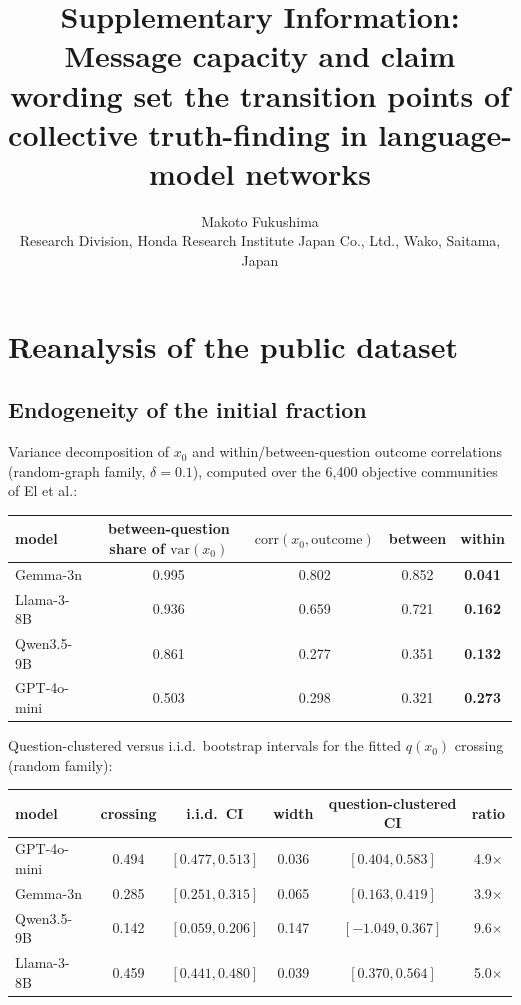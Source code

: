 \documentclass[11pt]{article}
\title{Supplementary Information:\\Message capacity and claim wording set the transition points of collective truth-finding in language-model networks}
\author{Makoto Fukushima\\[3pt]
{\normalsize Research Division, Honda Research Institute Japan Co., Ltd.,
Wako, Saitama, Japan}}
\date{}
\begin{document}
\maketitle
\tableofcontents

\section{Reanalysis of the public dataset}

\subsection{Endogeneity of the initial fraction}

Variance decomposition of $x_0$ and within/between-question outcome
correlations (random-graph family, $\delta = 0.1$), computed over the 6{,}400
objective communities of El et al.:

\begin{center}
\begin{tabular}{lcccc}
\toprule
model & between-question share of $\mathrm{var}(x_0)$ &
$\mathrm{corr}(x_0,\text{outcome})$ & between & \textbf{within} \\
\midrule
Gemma-3n     & 0.995 & 0.802 & 0.852 & \textbf{0.041} \\
Llama-3-8B   & 0.936 & 0.659 & 0.721 & \textbf{0.162} \\
Qwen3.5-9B   & 0.861 & 0.277 & 0.351 & \textbf{0.132} \\
GPT-4o-mini  & 0.503 & 0.298 & 0.321 & \textbf{0.273} \\
\bottomrule
\end{tabular}
\end{center}

Question-clustered versus i.i.d.\ bootstrap intervals for the fitted
$q(x_0)$ crossing (random family):

\begin{center}
\begin{tabular}{lccccc}
\toprule
model & crossing & i.i.d.\ CI & width & question-clustered CI & ratio \\
\midrule
GPT-4o-mini & 0.494 & $[0.477, 0.513]$ & 0.036 & $[0.404, 0.583]$ & 4.9$\times$ \\
Gemma-3n    & 0.285 & $[0.251, 0.315]$ & 0.065 & $[0.163, 0.419]$ & 3.9$\times$ \\
Qwen3.5-9B  & 0.142 & $[0.059, 0.206]$ & 0.147 & $[-1.049, 0.367]$ & 9.6$\times$ \\
Llama-3-8B  & 0.459 & $[0.441, 0.480]$ & 0.039 & $[0.370, 0.564]$ & 5.0$\times$ \\
\bottomrule
\end{tabular}
\end{center}
\end{document}
